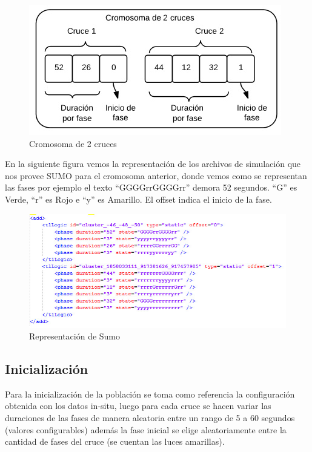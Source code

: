\begin{figure}[h]
\centering
\includegraphics[width=0.7\linewidth]{Figures/cromosoma1}
\caption{Cromosoma de 2 cruces}
\label{fig:cromosoma1}
\end{figure}

En la siguiente figura vemos la representación de los archivos de simulación que nos provee SUMO para el cromosoma anterior, donde vemos como se representan las fases por ejemplo el texto “GGGGrrGGGGrr” demora 52 segundos. “G” es Verde, “r” es Rojo e “y” es Amarillo. El offset indica el inicio de la fase.

\begin{figure}[h]
\centering
\includegraphics[width=\linewidth]{Figures/rep_sumo}
\caption{Representación de Sumo}
\label{fig:rep_sumo}
\end{figure}


\subsection{Inicialización}

Para la inicialización de la población se toma como referencia
la configuración obtenida con los datos in-situ, luego para cada
cruce se hacen variar las duraciones de las fases de manera aleatoria entre un rango de  5 a 60  segundos  (valores configurables)
además la fase inicial se elige aleatoriamente entre la cantidad de fases del cruce (se cuentan las luces amarillas).

